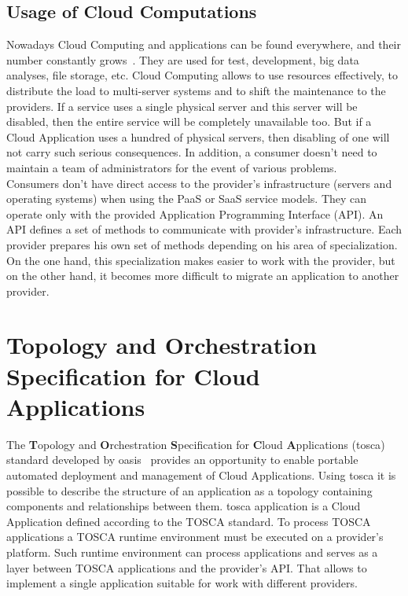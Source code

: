 \subsection*{Usage of Cloud Computations}
Nowadays Cloud Computing and applications can be found everywhere, and their number constantly grows~\cite*{cloud_stat}.
They are used for test, development, big data analyses, file storage, etc.
Cloud Computing allows to use resources effectively, to distribute the load to multi-server systems and to shift the maintenance to the providers. 
If  a service uses a single physical server and this server will be disabled, then the entire service will be completely unavailable too.
But if a Cloud Application uses a hundred of physical servers, then disabling of one will not carry such serious consequences.
In addition, a consumer doesn't need to maintain a team of administrators for the event of various problems.\\
Consumers don't have direct access to the provider's infrastructure (servers and operating systems) when using the PaaS or SaaS service models. 
They can operate only with the provided Application Programming Interface (API).
An API defines a set of methods to communicate with provider's infrastructure. 
Each provider prepares his own set of methods depending on his area of specialization. 
On the one hand, this specialization makes easier to work with the provider, but on the other hand, it becomes more difficult to migrate an application to another provider.
\section{Topology and Orchestration Specification for Cloud	Applications} \label{sec:tosca}
The \textbf{T}opology and \textbf{O}rchestration \textbf{S}pecification for \textbf{C}loud \textbf{A}pplications (\gls{tosca}) standard developed by \gls{oasis}~\cite{oasis} provides an opportunity to enable portable automated deployment and management of Cloud Applications.
Using \gls{tosca} it is possible to describe the structure of an application as a topology containing components and relationships between them.
\gls{tosca} application is a Cloud Application defined according to the TOSCA standard. %
To process TOSCA applications a TOSCA runtime environment must be executed on a provider's platform. 
Such runtime environment can process applications and serves as a layer between TOSCA applications and the provider's API.
That allows to implement a single application suitable for work with different providers. 
